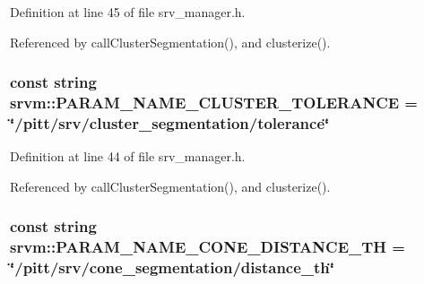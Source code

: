 Definition at line 45 of file srv\-\_\-manager.\-h.



Referenced by call\-Cluster\-Segmentation(), and clusterize().

\hypertarget{namespacesrvm_a606c20312640e9cc8710e4d43f0cb167}{
\subsubsection[{P\-A\-R\-A\-M\-\_\-\-N\-A\-M\-E\-\_\-\-C\-L\-U\-S\-T\-E\-R\-\_\-\-T\-O\-L\-E\-R\-A\-N\-C\-E}]{\setlength{\rightskip}{0pt plus 5cm}const string srvm\-::\-P\-A\-R\-A\-M\-\_\-\-N\-A\-M\-E\-\_\-\-C\-L\-U\-S\-T\-E\-R\-\_\-\-T\-O\-L\-E\-R\-A\-N\-C\-E = \char`\"{}/pitt/srv/cluster\-\_\-segmentation/tolerance\char`\"{}}}\label{namespacesrvm_a606c20312640e9cc8710e4d43f0cb167}


Definition at line 44 of file srv\-\_\-manager.\-h.



Referenced by call\-Cluster\-Segmentation(), and clusterize().

\hypertarget{namespacesrvm_aeec863664b339e3c4808736477fe1378}{
\subsubsection[{P\-A\-R\-A\-M\-\_\-\-N\-A\-M\-E\-\_\-\-C\-O\-N\-E\-\_\-\-D\-I\-S\-T\-A\-N\-C\-E\-\_\-\-T\-H}]{\setlength{\rightskip}{0pt plus 5cm}const string srvm\-::\-P\-A\-R\-A\-M\-\_\-\-N\-A\-M\-E\-\_\-\-C\-O\-N\-E\-\_\-\-D\-I\-S\-T\-A\-N\-C\-E\-\_\-\-T\-H = \char`\"{}/pitt/srv/cone\-\_\-segmentation/distance\-\_\-th\char`\"{}}}\label{namespacesrvm_aeec863664b339e3c4808736477fe1378}


